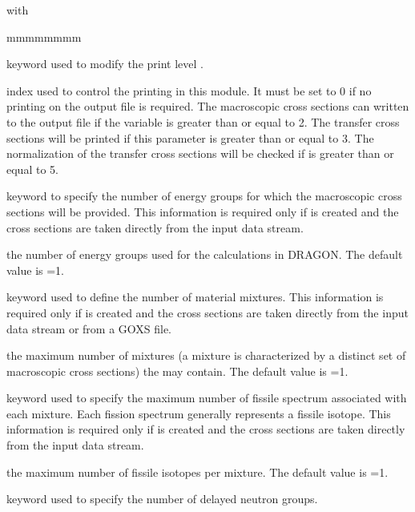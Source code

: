 \noindent with
\begin{ListeDeDescription}{mmmmmmmm}

\item[\moc{EDIT}] keyword used to modify the print level .

\item[\dusa{iprint}] index used to control the printing in this module.
It must be set to 0 if no printing on the output file is required. The
macroscopic cross sections can written to the output file if the
variable  is greater than or equal to 2. The transfer cross
sections will be printed if this parameter is greater than or equal to 3. The
normalization of the transfer cross sections will be checked if 
is greater than or equal to 5.

\item[\moc{NGRO}] keyword to specify the number of energy groups for which
the macroscopic cross sections will be provided. This information is required
only if  is created and the cross sections are taken directly from
the input data stream.

\item[\dusa{ngroup}] the number of energy groups used for the calculations in
DRAGON. The default value is =1. 

\item[\moc{NMIX}] keyword used to define the number of material mixtures.
This information is required only if  is created and the cross
sections are taken directly from the input data stream or from a GOXS file.

\item[\dusa{nmixt}] the maximum number of mixtures (a mixture is
characterized by a distinct set of macroscopic cross sections) the 
 may contain. The default value is =1.

\item[\moc{NIFI}] keyword used to specify the maximum number of fissile
spectrum associated with each mixture. Each fission spectrum generally
represents a fissile isotope. This information is required only if 
is created and the cross sections are taken directly from the input data stream.

\item[\dusa{nifiss}] the maximum number of fissile isotopes per mixture. The
default value is =1.

\item[\moc{DELP}] keyword used to specify the number of delayed neutron groups.


\end{ListeDeDescription}
